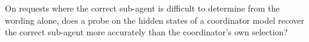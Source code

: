 \begin{rqbox}[RQ1]
On requests where the correct sub-agent is difficult to determine from the wording alone, does a probe on the hidden states of a coordinator model recover the correct sub-agent more accurately than the coordinator's own selection?
\end{rqbox}
